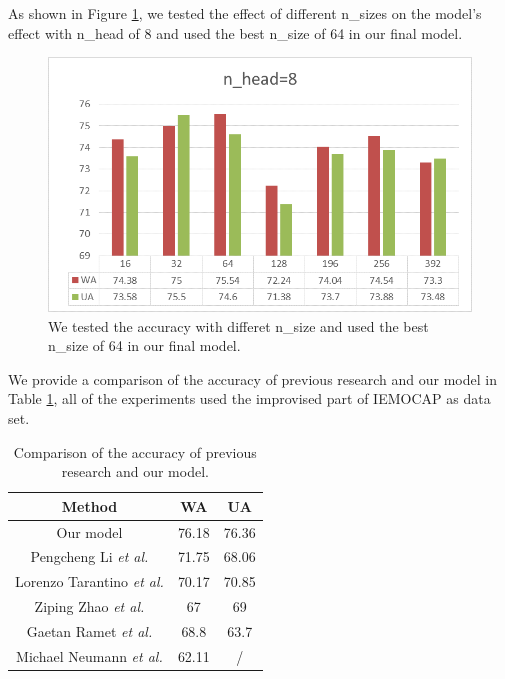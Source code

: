 \documentclass[10pt, conference, compsocconf]{IEEEtran}
\begin{document}
As shown in Figure \ref{SizeResult}, we tested the effect of different n\_sizes on the model's effect with n\_head of 8 and used the best n\_size of 64 in our final model.

\begin{figure}[h]
	
	\centering
	\includegraphics[width=0.95\linewidth]{pic/n_head8}
	\caption{We tested the accuracy with differet n\_size and used the best n\_size of 64 in our final model.}
	\label{SizeResult}
\end{figure}

We provide a comparison of the accuracy of previous research and our model in Table \ref{previous}, all of the experiments used the improvised part of IEMOCAP as data set.

\begin{table}[h]
	\renewcommand\arraystretch{1.5}
	\setlength{\abovecaptionskip}{-0.2cm}
	\caption{Comparison of the accuracy of previous research and our model.}
	\label{previous}
	\begin{center}  
		\begin{tabular}{|c|c|c|} 
			\hline  
			Method & WA & UA\\   
			\hline  
			Our model & 76.18 & 76.36 \\   
			\hline
			Pengcheng Li \emph{et al.}\cite{li2018attention} & 71.75 & 68.06 \\   			
			\hline
			Lorenzo Tarantino \emph{et al.}\cite{tarantino2019self} & 70.17 & 70.85 \\   
			\hline
			Ziping Zhao \emph{et al.}\cite{zhao2019attention} & 67 & 69 \\   
			\hline
			Gaetan Ramet \emph{et al.}\cite{ramet2018context} & 68.8 & 63.7 \\   
			\hline
			Michael Neumann \emph{et al.}\cite{neumann2017attentive} & 62.11 & / \\   
			\hline
		\end{tabular}  
	\end{center}  
\end{table}
\end{document}
